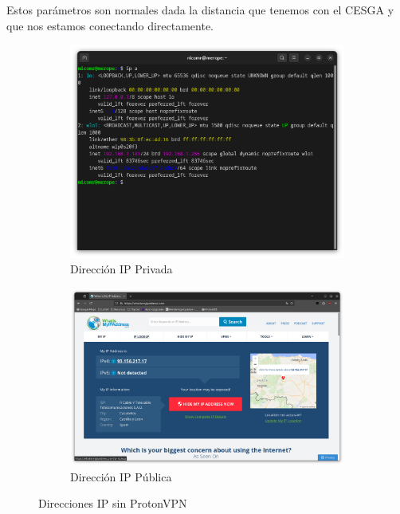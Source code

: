 Estos parámetros son normales dada la distancia que tenemos con el CESGA y que nos estamos conectando directamente.

\begin{figure}[H]
    \centering
    \begin{subfigure}{.5\textwidth}
        \centering
        \includegraphics[width=\linewidth]{IP-Privada.png}
        \caption{Dirección IP Privada}
    \end{subfigure}%
    \begin{subfigure}{.5\textwidth}
        \centering
        \includegraphics[width=\linewidth]{IP-Publica.png}
        \caption{Dirección IP Pública}
    \end{subfigure}
    \caption{Direcciones IP sin ProtonVPN}
    \label{fig:IPs}
\end{figure}


